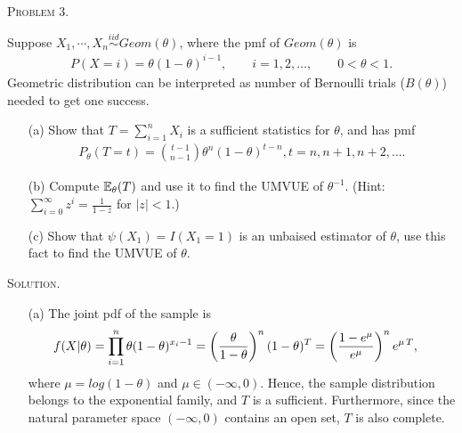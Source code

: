 \documentclass{article}
\begin{document}
\begin{CJK}{UTF8}{gbsn}
    \begin{shaded}
        \noindent\textsc{Problem 3.}\par
        Suppose $X_1, \cdots, X_n \mathop{\sim}\limits^{iid} Geom(\theta)$, where the pmf of $Geom(\theta)$ is
        \begin{align}
            P(X=i) = \theta (1-\theta)^{i-1}, \qquad i=1, 2, \ldots, \qquad  0 < \theta < 1.
        \end{align}
        Geometric distribution can be interpreted as number of Bernoulli trials ($B(\theta)$) needed to get
        one success.
        \begin{itemize}
            \item [(a)] Show that $T=\sum_{i=1}^n X_i$ is a sufficient statistics for $\theta$, and has pmf
                  \begin{align}
                      P_{\theta}(T=t) = \binom{t-1}{n-1}\theta^n(1-\theta)^{t-n}, t=n, n+1, n+2, \ldots.
                  \end{align}
            \item [(b)] Compute ${\mathbb E}_{\theta}(T)$ and use it to find the UMVUE of $\theta^{-1}$. (Hint: $\sum_{i=0}^{\infty}z^{i} = \frac{1}{1-z}$ for $|z| < 1$.)
            \item [(c)] Show that $\psi(X_1) = I(X_1=1)$ is an unbaised estimator of $\theta$, use this fact to find the UMVUE of $\theta$.
        \end{itemize}
    \end{shaded}
    \noindent\textsc{Solution.}\par
    \begin{itemize}
        \item [(a)] The joint pdf of the sample is
              \begin{align}
                  f(X|\theta) & = \prod_{i=1}^n \theta (1-\theta)^{x_i-1}   = \left (\frac{\theta}{1 - \theta} \right )^n (1-\theta)^{T} =  \left ( \frac{1-e^{\mu}}{e^{\mu}}\right )^n e^{\mu \, T}, \notag
              \end{align}
              where $\mu = log(1-\theta)$ and $\mu \in (-\infty, 0)$.
              Hence, the sample distribution belongs to the exponential family, and $T$ is a sufficient.
              Furthermore, since the natural parameter space $(-\infty, 0)$ contains an open set, $T$ is also complete.


\end{itemize}
\end{CJK}
\end{document}
